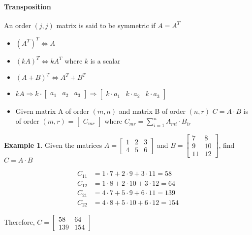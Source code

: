 \documentclass{article}
\theoremstyle{definition}
\newtheorem{example}[theorem]{Example}
\theoremstyle{remark}
\begin{document}
\paragraph{Transposition}
An order $(j,j)$ matrix is said to be symmetric if $A = A^T$

\begin{itemize}
    \item $(A^T)^T \Leftrightarrow A$
    \item $(kA)^T \Leftrightarrow kA^T$ where $k$ is a scalar
    \item $(A + B)^T \Leftrightarrow A^T + B^T$
    \item $kA \Rightarrow k \cdot \begin{bmatrix}
        a_1 & a_2 & a_3
    \end{bmatrix} \Rightarrow \begin{bmatrix}
        k \cdot a_1 & k \cdot a_2 & k \cdot a_3
    \end{bmatrix}$
    \item Given matrix A of order $(m,n)$ and matrix B of order $(n,r)$
    \subitem $C = A \cdot B$ is of order $(m,r)$ = $\begin{bmatrix}
        C_{mr}
    \end{bmatrix}$ where $C_{mr} = \sum_{i=1}^{n} A_{mi} \cdot B_{ir}$
\end{itemize}

\begin{example}
    Given the matrices $A = \begin{bmatrix}
        1 & 2 & 3 \\
        4 & 5 & 6
    \end{bmatrix}$ and $B = \begin{bmatrix}
        7 & 8 \\
        9 & 10 \\
        11 & 12
    \end{bmatrix}$, find $C = A \cdot B$

    \begin{align*}
        C_{11} &= 1 \cdot 7 + 2 \cdot 9 + 3 \cdot 11 = 58 \\
        C_{12} &= 1 \cdot 8 + 2 \cdot 10 + 3 \cdot 12 = 64 \\
        C_{21} &= 4 \cdot 7 + 5 \cdot 9 + 6 \cdot 11 = 139 \\
        C_{22} &= 4 \cdot 8 + 5 \cdot 10 + 6 \cdot 12 = 154
    \end{align*}

    Therefore, $C = \begin{bmatrix}
        58 & 64 \\
        139 & 154
    \end{bmatrix}$
\end{example}
\end{document}
